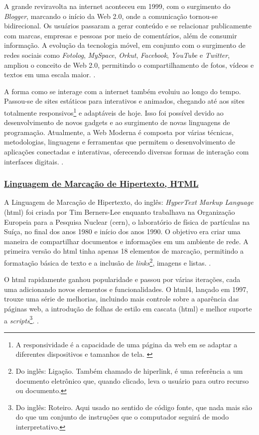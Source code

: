 A grande reviravolta na internet aconteceu em 1999, com o surgimento do
\textit{Blogger},
marcando o início da
Web
2.0, onde a comunicação tornou-se bidirecional. Os usuários
passaram a gerar conteúdo e se relacionar publicamente com marcas, empresas e pessoas por
meio de comentários, além de consumir informação. A evolução da tecnologia móvel, em
conjunto com o surgimento de redes sociais como
\textit{Fotolog},
\textit{MySpace},
\textit{Orkut},
\textit{Facebook},
\textit{YouTube}
e
\textit{Twitter},
ampliou o conceito de Web 2.0, permitindo o compartilhamento de fotos,
vídeos e textos em uma escala maior.
\cite{vitoriano}.

A forma como se interage com a internet também evoluiu ao longo do tempo.
Passou-se de sites estáticos para interativos e animados, chegando até aos sites totalmente
responsivos\footnote{A responsividade é a capacidade de uma página da
    \acrshort{web}
    em se adaptar a diferentes dispositivos e tamanhos de tela.
    \cite{responsivo}
}
e adaptáveis de hoje. Isso foi possível devido ao desenvolvimento de novos
gadgets e ao surgimento de novas linguagens de programação. Atualmente, a Web Moderna é
composta por várias técnicas, metodologias, linguagens e ferramentas que permitem o
desenvolvimento de aplicações conectadas e interativas, oferecendo diversas formas de
interação com interfaces digitais.
\cite{vitoriano}.

\subsubsection{\underline{Linguagem de Marcação de Hipertexto, HTML}}

A Linguagem de Marcação de Hipertexto, do inglês: \textit{HyperText Markup Language}
(\acrshort{html})
foi criada por Tim Berners-Lee enquanto trabalhava na Organização Europeia para a
Pesquisa Nuclear
(\acrshort{cern}),
o laboratório de física de partículas na Suíça, no final dos anos
1980 e início dos anos 1990. O objetivo era criar uma maneira de compartilhar documentos e
informações em um ambiente de rede. A primeira versão do
\acrshort{html}
tinha apenas 18 elementos
de marcação, permitindo a formatação básica de texto e a inclusão de
\textit{links}\footnote{Do inglês: Ligação. Também chamado de hiperlink, é uma referência a um
    documento eletrônico que, quando clicado, leva o usuário para outro recurso
    ou documento.
},
imagens e listas.
\cite{w3c}.

O
\acrshort{html}
rapidamente ganhou popularidade e passou por várias iterações, cada uma
adicionando novos elementos e funcionalidades. O
\acrshort{html}4,
lançado em 1997, trouxe uma
série de melhorias, incluindo mais controle sobre a aparência das páginas web, a introdução
de folhas de estilo em cascata
(\acrshort{html})
e melhor suporte a
\textit{scripts}\footnote{Do inglês: Roteiro. Aqui usado no sentido de código fonte, que nada mais são
    do que um conjunto de instruções que o computador seguirá de modo interpretativo.
}.
\cite{w3c}.

